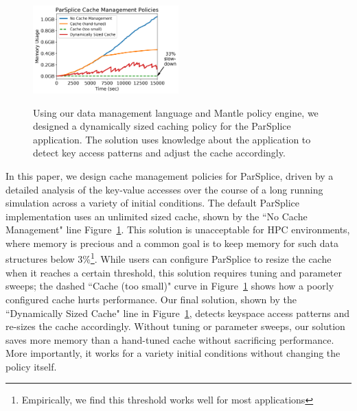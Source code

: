 \begin{figure}[t]
\noindent\includegraphics[width=0.5\textwidth]{figures/cache-management.png}\\

\caption{Using our data management language and Mantle policy engine, we
designed a dynamically sized caching policy for the ParSplice application. The
solution uses knowledge about the application to detect key access patterns and
adjust the cache accordingly. 
\label{fig:cache-management}}
\end{figure}

In this paper, we design cache management policies for ParSplice, driven by a
detailed analysis of the key-value accesses over the course of a long running
simulation across a variety of initial conditions. The default ParSplice
implementation uses an unlimited sized cache, shown by the ``No Cache
Management" line Figure~\ref{fig:cache-management}. This solution is
unacceptable for HPC environments, where memory is precious and a common goal
is to keep memory for such data structures below 3\%\footnote{Empirically, we
find this threshold works well for most applications}.  While users can
configure ParSplice to resize the cache when it reaches a certain threshold,
this solution requires tuning and parameter sweeps; the dashed ``Cache (too
small)" curve in Figure~\ref{fig:cache-management} shows how a poorly
configured cache hurts performance.  Our final solution, shown by the
``Dynamically Sized Cache" line in Figure~\ref{fig:cache-management}, detects
keyspace access patterns and re-sizes the cache accordingly.  Without tuning or
parameter sweeps, our solution saves more memory than a hand-tuned cache
without sacrificing performance.  More importantly, it works for a variety
initial conditions without changing the policy itself.

